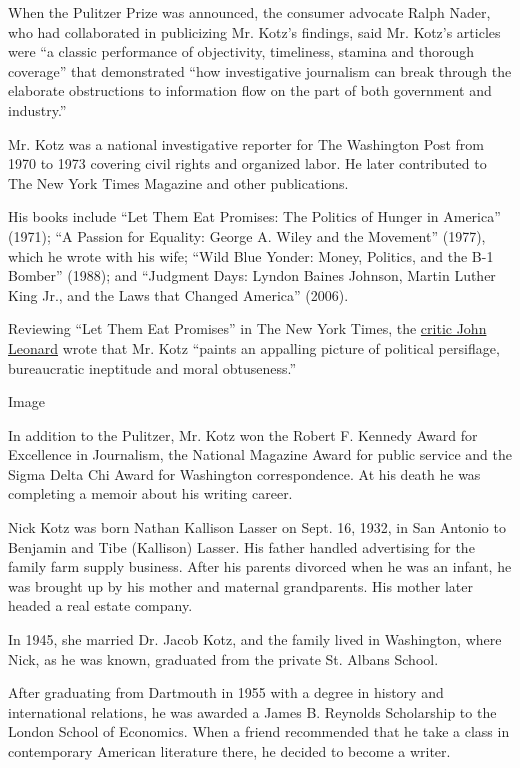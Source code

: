 When the Pulitzer Prize was announced, the consumer advocate Ralph
Nader, who had collaborated in publicizing Mr. Kotz's findings, said Mr.
Kotz's articles were ``a classic performance of objectivity, timeliness,
stamina and thorough coverage'' that demonstrated ``how investigative
journalism can break through the elaborate obstructions to information
flow on the part of both government and industry.''

Mr. Kotz was a national investigative reporter for The Washington Post
from 1970 to 1973 covering civil rights and organized labor. He later
contributed to The New York Times Magazine and other publications.

His books include ``Let Them Eat Promises: The Politics of Hunger in
America'' (1971); ``A Passion for Equality: George A. Wiley and the
Movement'' (1977), which he wrote with his wife; ``Wild Blue Yonder:
Money, Politics, and the B-1 Bomber'' (1988); and ``Judgment Days:
Lyndon Baines Johnson, Martin Luther King Jr., and the Laws that Changed
America'' (2006).

Reviewing ``Let Them Eat Promises'' in The New York Times, the
\href{https://www.nytimes3xbfgragh.onion/1970/01/15/archives/books-of-the-times-seven-million-hungry-children.html}{critic
John Leonard} wrote that Mr. Kotz ``paints an appalling picture of
political persiflage, bureaucratic ineptitude and moral obtuseness.''

Image

In addition to the Pulitzer, Mr. Kotz won the Robert F. Kennedy Award
for Excellence in Journalism, the National Magazine Award for public
service and the Sigma Delta Chi Award for Washington correspondence. At
his death he was completing a memoir about his writing career.

Nick Kotz was born Nathan Kallison Lasser on Sept. 16, 1932, in San
Antonio to Benjamin and Tibe (Kallison) Lasser. His father handled
advertising for the family farm supply business. After his parents
divorced when he was an infant, he was brought up by his mother and
maternal grandparents. His mother later headed a real estate company.

In 1945, she married Dr. Jacob Kotz, and the family lived in Washington,
where Nick, as he was known, graduated from the private St. Albans
School.

After graduating from Dartmouth in 1955 with a degree in history and
international relations, he was awarded a James B. Reynolds Scholarship
to the London School of Economics. When a friend recommended that he
take a class in contemporary American literature there, he decided to
become a writer.

